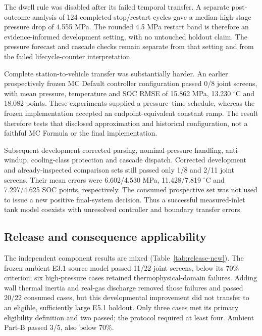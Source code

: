 \documentclass[12pt,a4paper]{article}
\begin{document}
The dwell rule was disabled after its failed temporal transfer. A separate
post-outcome analysis of 124 completed stop/restart cycles gave a median
high-stage pressure drop of 4.555 MPa. The rounded 4.5 MPa restart band is
therefore an evidence-informed development setting, with no untouched holdout
claim. The pressure forecast and cascade checks remain separate from that
setting and from the failed lifecycle-counter interpretation.

Complete station-to-vehicle transfer was substantially harder. An earlier
prospectively frozen MC Default controller configuration passed 0/8 joint
screens, with mean pressure, temperature and SOC RMSE of 15.862 MPa,
13.230 $^{\circ}$C and 18.082 points. These experiments supplied a
pressure--time schedule, whereas the frozen implementation accepted an
endpoint-equivalent constant ramp. The result therefore tests that disclosed
approximation and historical configuration, not a faithful MC Formula or the
final implementation.

Subsequent development corrected parsing, nominal-pressure handling,
anti-windup, cooling-class protection and cascade dispatch. Corrected development
and already-inspected comparison sets still passed only 1/8 and 2/11 joint
screens. Their mean errors were 6.602/4.530 MPa, 11.428/7.819 $^{\circ}$C
and 7.297/4.625 SOC points, respectively. The consumed prospective set was
not used to issue a new positive final-system decision. Thus a successful
measured-inlet tank model coexists with unresolved controller and boundary
transfer errors.

\subsection{Release and consequence applicability}
The independent component results are mixed (Table~\ref{tab:release-new}). The
frozen ambient E3.1 source model passed 11/22 joint screens, below its 70\%
criterion; six high-pressure cases retained thermophysical-domain failures.
Adding wall thermal inertia and real-gas discharge removed those failures and
passed 20/22 consumed cases, but this developmental improvement did not transfer
to an eligible, sufficiently large E5.1 holdout. Only three cases met its
primary eligibility definition and two passed; the protocol required at least
four. Ambient Part-B passed 3/5, also below 70\%.
\end{document}
